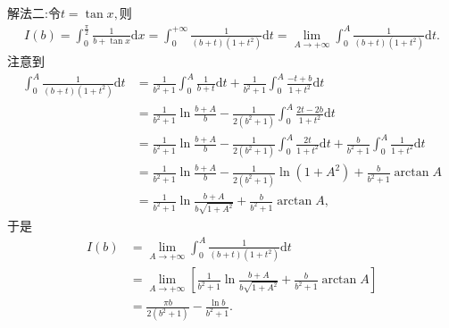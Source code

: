 \documentclass[../../main.tex]{subfiles}%
\begin{document}
\begin{solution}
{\color{blue} 解法二:}令$t=\tan x,$则
\begin{align*}
I\left( b \right) =\int_0^{\frac{\pi}{2}}{\frac{1}{b+\tan x}\mathrm{d}x}=\int_0^{+\infty}{\frac{1}{\left( b+t \right) \left( 1+t^2 \right)}\mathrm{d}t}=\lim\limits_{A\rightarrow +\infty}\int_0^A{\frac{1}{\left( b+t \right) \left( 1+t^2 \right)}\mathrm{d}t}.
\end{align*}
注意到
\begin{align*}
\int_0^A{\frac{1}{\left( b+t \right) \left( 1+t^2 \right)}\mathrm{d}t}&=\frac{1}{b^2+1}\int_0^A{\frac{1}{b+t}\mathrm{d}t}+\frac{1}{b^2+1}\int_0^A{\frac{-t+b}{1+t^2}\mathrm{d}t} \\
&=\frac{1}{b^2+1}\ln \frac{b+A}{b}-\frac{1}{2\left( b^2+1 \right)}\int_0^A{\frac{2t-2b}{1+t^2}\mathrm{d}t} \\
&=\frac{1}{b^2+1}\ln \frac{b+A}{b}-\frac{1}{2\left( b^2+1 \right)}\int_0^A{\frac{2t}{1+t^2}\mathrm{d}t}+\frac{b}{b^2+1}\int_0^A{\frac{1}{1+t^2}\mathrm{d}t} \\
&=\frac{1}{b^2+1}\ln \frac{b+A}{b}-\frac{1}{2\left( b^2+1 \right)}\ln \left( 1+A^2 \right) +\frac{b}{b^2+1}\arctan A \\
&=\frac{1}{b^2+1}\ln \frac{b+A}{b\sqrt{1+A^2}}+\frac{b}{b^2+1}\arctan A,
\end{align*}
于是
\begin{align*}
I\left( b \right) &=\lim\limits_{A\rightarrow +\infty}\int_0^A{\frac{1}{\left( b+t \right) \left( 1+t^2 \right)}\mathrm{d}t} \\
&=\lim\limits_{A\rightarrow +\infty}\left[ \frac{1}{b^2+1}\ln \frac{b+A}{b\sqrt{1+A^2}}+\frac{b}{b^2+1}\arctan A \right] \\
&=\frac{\pi b}{2\left( b^2+1 \right)}-\frac{\ln b}{b^2+1}.
\end{align*}
\end{solution}
\end{document}
